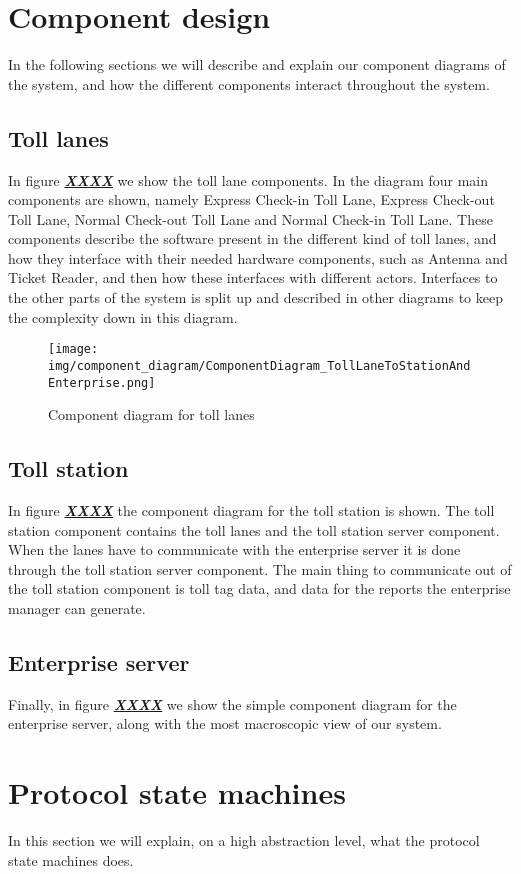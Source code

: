 \section*{Component design}
In the following sections we will describe and explain our component diagrams of the system, and how the different components interact throughout the system.
\subsection*{Toll lanes}
In figure \textbf{\underline{\textit{XXXX}}} we show the toll lane components. In the diagram four main components are shown, namely Express Check-in Toll Lane, Express Check-out Toll Lane, Normal Check-out Toll Lane and Normal Check-in Toll Lane. These components describe the software present in the different kind of toll lanes, and how they interface with their needed hardware components, such as Antenna and Ticket Reader, and then how these interfaces with different actors. Interfaces to the other parts of the system is split up and described in other diagrams to keep the complexity down in this diagram.
\begin{figure}
\centering
\texttt{[image: img/component\_diagram/ComponentDiagram\_TollLaneToStationAndEnterprise.png]}
\caption{Component diagram for toll lanes}
\label{fig:ComponentDiagram_TollLaneToStationAndEnterprise}
\end{figure}

\subsection*{Toll station}
In figure \textbf{\underline{\textit{XXXX}}} the component diagram for the toll station is shown. The toll station component contains the toll lanes and the toll station server component. When the lanes have to communicate with the enterprise server it is done through the toll station server component. The main thing to communicate out of the toll station component is toll tag data, and data for the reports the enterprise manager can generate.
\subsection*{Enterprise server}
Finally, in figure \textbf{\underline{\textit{XXXX}}} we show the simple component diagram for the enterprise server, along with the most macroscopic view of our system. 

\section*{Protocol state machines}
In this section we will explain, on a high abstraction level, what the protocol state machines does.
